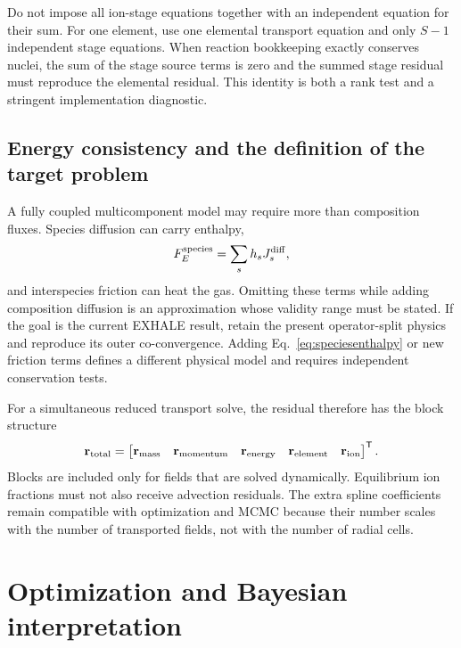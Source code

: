 \documentclass[english,a4paper]{my_memo}
\newcommand{\vect}[1]{\mathbf{#1}}
\begin{document}
Do not impose all ion-stage equations together with an independent equation for
their sum.  For one element, use one elemental transport equation and only
\(S-1\) independent stage equations.  When reaction bookkeeping exactly
conserves nuclei, the sum of the stage source terms is zero and the summed
stage residual must reproduce the elemental residual.  This identity is both a
rank test and a stringent implementation diagnostic.

\subsection{Energy consistency and the definition of the target problem}

A fully coupled multicomponent model may require more than composition fluxes.
Species diffusion can carry enthalpy,
\begin{equation}
 F_E^{\rm species}=\sum_s h_sJ_s^{\rm diff},
 \label{eq:speciesenthalpy}
\end{equation}
and interspecies friction can heat the gas.  Omitting these terms while adding
composition diffusion is an approximation whose validity range must be stated.
If the goal is the current EXHALE result, retain the present operator-split
physics and reproduce its outer co-convergence.  Adding
Eq.~\eqref{eq:speciesenthalpy} or new friction terms defines a different
physical model and requires independent conservation tests.

For a simultaneous reduced transport solve, the residual therefore has the
block structure
\begin{equation}
 \vect{r}_{\rm total}=
 \begin{bmatrix}
  \vect{r}_{\rm mass} & \vect{r}_{\rm momentum} & \vect{r}_{\rm energy} &
  \vect{r}_{\rm element} & \vect{r}_{\rm ion}
 \end{bmatrix}^{\mathsf T}.
 \label{eq:transportblocks}
\end{equation}
Blocks are included only for fields that are solved dynamically.  Equilibrium
ion fractions must not also receive advection residuals.  The extra spline
coefficients remain compatible with optimization and MCMC because their number
scales with the number of transported fields, not with the number of radial
cells.

\section{Optimization and Bayesian interpretation}\label{sec:inference}
\end{document}
